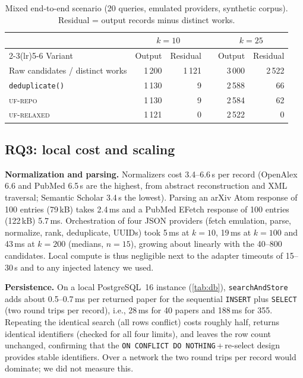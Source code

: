 \documentclass[conference]{IEEEtran}
\newcommand{\code}[1]{\texttt{\small #1}}
\begin{document}
\begin{table}[t]
\centering
\caption{Mixed end-to-end scenario (20 queries, emulated providers, synthetic corpus). Residual = output records minus distinct works.}
\label{tab:e2d}
\footnotesize
\setlength{\tabcolsep}{3pt}
\begin{tabular}{@{}l r r r r r@{}}
\toprule
 & \multicolumn{2}{c}{$k{=}10$} & & \multicolumn{2}{c}{$k{=}25$} \\
\cmidrule(lr){2-3}\cmidrule(lr){5-6}
Variant & Output & Residual & & Output & Residual \\
\midrule
Raw candidates / distinct works & 1\,200 & 1\,121 & & 3\,000 & 2\,522 \\
\code{deduplicate()} & 1\,130 & 9 & & 2\,588 & 66 \\
\textsc{uf-repo} & 1\,130 & 9 & & 2\,584 & 62 \\
\textsc{uf-relaxed} & 1\,121 & 0 & & 2\,522 & 0 \\
\bottomrule
\end{tabular}
\end{table}

\subsection{RQ3: local cost and scaling}
\textbf{Normalization and parsing.} Normalizers cost 3.4--6.6\,\textmu s per record (OpenAlex 6.6 and PubMed 6.5\,\textmu s are the highest, from abstract reconstruction and XML traversal; Semantic Scholar 3.4\,\textmu s the lowest). Parsing an arXiv Atom response of 100 entries (79\,kB) takes 2.4\,ms and a PubMed EFetch response of 100 entries (122\,kB) 5.7\,ms. Orchestration of four JSON providers (fetch emulation, parse, normalize, rank, deduplicate, UUIDs) took 5\,ms at $k{=}10$, 19\,ms at $k{=}100$ and 43\,ms at $k{=}200$ (medians, $n{=}15$), growing about linearly with the 40--800 candidates. Local compute is thus negligible next to the adapter timeouts of 15--30\,s and to any injected latency we used.

\textbf{Persistence.} On a local PostgreSQL~16 instance (\cref{tab:db}), \code{searchAndStore} adds about 0.5--0.7\,ms per returned paper for the sequential \code{INSERT} plus \code{SELECT} (two round trips per record), i.e., 28\,ms for 40 papers and 188\,ms for 355. Repeating the identical search (all rows conflict) costs roughly half, returns identical identifiers (checked for all four limits), and leaves the row count unchanged, confirming that the \code{ON CONFLICT DO NOTHING}\,+\,re-select design provides stable identifiers. Over a network the two round trips per record would dominate; we did not measure this.
\end{document}
